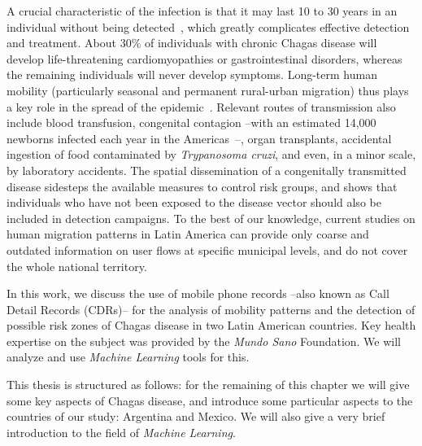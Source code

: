 A crucial characteristic of the infection is that it may last 10 to 30 years in an individual without being detected~\cite{rassi2012american}, which greatly complicates effective detection and treatment. About 30\% of individuals with chronic Chagas disease will develop life-threatening cardiomyopathies or gastrointestinal disorders, whereas
the remaining individuals will never develop symptoms.
Long-term human mobility (particularly seasonal and permanent rural-urban migration) thus plays a key role in the spread of the epidemic~\cite{briceno2009chagas}. Relevant routes of transmission also include blood transfusion, congenital contagion --with an estimated 14,000 newborns infected each year in the Americas~\cite{OPS2006chagas}--,
organ transplants,
accidental ingestion of food contaminated by \textit{Trypanosoma cruzi}, and even, in a minor scale,
by laboratory accidents.
The spatial dissemination of a congenitally transmitted disease sidesteps the available measures to control risk groups, and shows that individuals who have not been exposed to the disease vector should also be included in detection campaigns.
To the best of our knowledge, current studies on human migration patterns in Latin America can provide only coarse and outdated information on user flows at specific municipal levels, and do not cover the whole national territory.

In this work, we discuss the use of mobile phone records --also known as Call Detail Records (CDRs)-- for the analysis of mobility patterns and the detection of possible risk zones of Chagas disease in two Latin American countries. Key health expertise on the subject was provided by the \textit{Mundo Sano} Foundation. We will analyze and use  \textit{Machine Learning} tools for this.

This thesis is structured as follows: for the remaining of this chapter we will give some key aspects of Chagas disease, and introduce some particular aspects to the countries of our study: Argentina and Mexico. We will also give a very brief introduction to the field of \textit{Machine Learning}.

